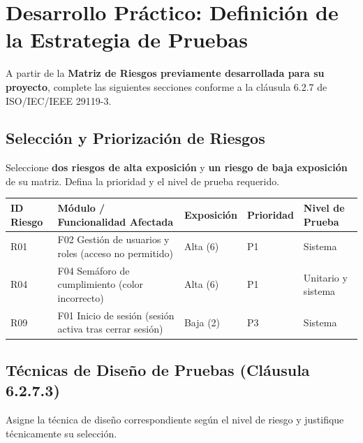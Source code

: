 \documentclass[11pt,a4paper]{article}
\begin{document}
\section{Desarrollo Práctico: Definición de la Estrategia de Pruebas}
A partir de la \textbf{Matriz de Riesgos previamente desarrollada para su proyecto}, complete las siguientes secciones conforme a la cláusula 6.2.7 de ISO/IEC/IEEE 29119-3.

\subsection{Selección y Priorización de Riesgos}
Seleccione \textbf{dos riesgos de alta exposición} y \textbf{un riesgo de baja exposición} de su matriz. Defina la prioridad y el nivel de prueba requerido.

\vspace{6pt}
{\renewcommand{\arraystretch}{1.5}
\begin{tabularx}{\linewidth}{|P{1.5cm}|Y|P{1.9cm}|P{1.6cm}|P{3cm}|}
\hline
{}\textbf{ID Riesgo} & \textbf{Módulo / Funcionalidad Afectada} & \textbf{Exposición} & \textbf{Prioridad} & \textbf{Nivel de Prueba}\\\hline
R01 & F02 Gestión de usuarios y roles (acceso no permitido) & Alta (6) & P1 & Sistema\\\hline
R04 & F04 Semáforo de cumplimiento (color incorrecto) & Alta (6) & P1 & Unitario y sistema\\\hline
R09 & F01 Inicio de sesión (sesión activa tras cerrar sesión) & Baja (2) & P3 & Sistema\\\hline
\end{tabularx}}

\subsection{Técnicas de Diseño de Pruebas (Cláusula 6.2.7.3)}
Asigne la técnica de diseño correspondiente según el nivel de riesgo y justifique técnicamente su selección.
\end{document}
